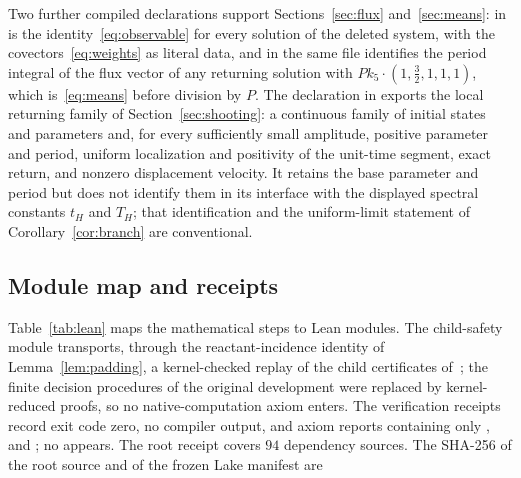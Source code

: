 \documentclass[11pt,a4paper]{article}
\theoremstyle{plain}
\theoremstyle{definition}
\theoremstyle{remark}
\begin{document}
Two further compiled declarations support Sections~\ref{sec:flux} and~\ref{sec:means}:  in  is the identity~\eqref{eq:observable} for every solution of the deleted system, with the covectors~\eqref{eq:weights} as literal data, and  in the same file identifies the period integral of the flux vector of any returning solution with $Pk_5\cdot(1,\tfrac32,1,1,1)$, which is~\eqref{eq:means} before division by $P$. The declaration  in  exports the local returning family of Section~\ref{sec:shooting}: a continuous family of initial states and parameters and, for every sufficiently small amplitude, positive parameter and period, uniform localization and positivity of the unit-time segment, exact return, and nonzero displacement velocity. It retains the base parameter and period but does not identify them in its interface with the displayed spectral constants $t_H$ and $T_H$; that identification and the uniform-limit statement of Corollary~\ref{cor:branch} are conventional.

\subsection{Module map and receipts}

Table~\ref{tab:lean} maps the mathematical steps to Lean modules. The child-safety module transports, through the reactant-incidence identity of Lemma~\ref{lem:padding}, a kernel-checked replay of the child certificates of~\cite[Theorem~4.7]{ParameterRich2026}; the finite decision procedures of the original development were replaced by kernel-reduced proofs, so no native-computation axiom enters. The verification receipts record exit code zero, no compiler output, and axiom reports containing only ,  and ; no  appears. The root receipt covers $94$ dependency sources. The SHA-256 of the root source  and of the frozen Lake manifest are
\begin{center}\small
{}\\
\end{center}
\end{document}
